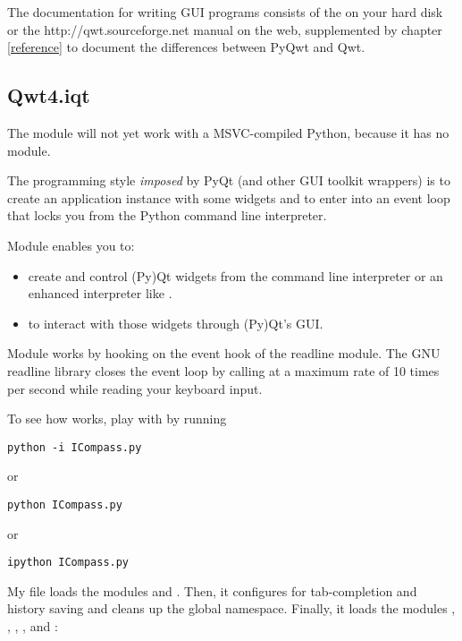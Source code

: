\documentclass{manual}
\newcommand{\Qwt}{\ulink{Qwt}
  {http://qwt.sourceforge.net}}
\newcommand{\Download}{\ulink{download}
  {http://pyqwt.sourceforge.net/download.html}}
\newcommand{\Future}{
  \begin{notice}[warning]
    The documentation is for the future PyQwt-4.2.2 which is only available
    from CVS. The \Download{} page has links for the latest releases.
  \end{notice}
}
\renewcommand{\Future}{}
\begin{document}
The documentation for writing GUI programs consists of the
 on your hard disk or the \Qwt{} manual on
the web, supplemented by chapter \ref{reference} to document the differences
between PyQwt and Qwt.


\subsection{Qwt4.iqt
  \label{iqt-intro}}

\Future{}

\begin{notice}[warning]
  The module  will not yet work with a MSVC-compiled Python,
  because it has no  module.
\end{notice}

The programming style \emph{imposed} by PyQt (and other GUI toolkit wrappers)
is to create an application instance with some widgets and to enter into an
event loop that locks you from the Python command line interpreter.

Module  enables you to:
\begin{itemize}
\item
  create and control (Py)Qt widgets from the command line interpreter or an
  enhanced interpreter like .
\item
  to interact with those widgets through (Py)Qt's GUI.
\end{itemize}

Module  works by hooking  on
the event hook of the readline module.
The GNU readline library closes the event loop by calling 
 at a maximum rate of 10 times per second
while reading your keyboard input.

To see how  works, play with  by running
\begin{verbatim}
python -i ICompass.py
\end{verbatim}
or
\begin{verbatim}
python ICompass.py
\end{verbatim}
or
\begin{verbatim}
ipython ICompass.py
\end{verbatim}

My  file loads the modules  and
.  Then, it configures  for tab-completion
and history saving and cleans up the global namespace.
Finally, it loads the modules , , ,
,  and :

\end{document}
